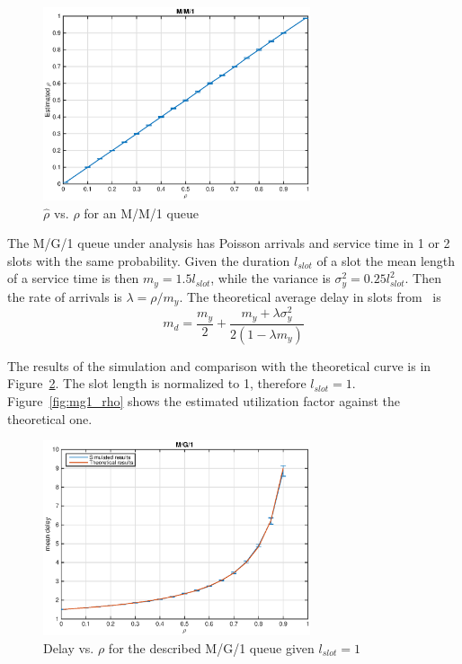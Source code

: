 \documentclass[10pt]{article}
\begin{document}
\begin{figure}[h!]
	\centering
	\includegraphics[width = 0.7\textwidth]{mm1_rho}
	\caption{$\hat{\rho}$ vs. $\rho$ for an M/M/1 queue}
	\label{fig:mm1_rho}
\end{figure}

The M/G/1 queue under analysis has Poisson arrivals and service time in 1 or 2 slots with the same probability. Given the duration $l_{slot}$ of a slot the mean length of a service time is then $m_y = 1.5 l_{slot}$, while the variance is $\sigma_y^2 = 0.25 l_{slot}^2$. Then the rate of arrivals is $\lambda = \rho/m_y$. The theoretical average delay in slots from~\cite{bz} is
\begin{equation}
	m_d = \frac{m_y}{2} + \frac{m_y + \lambda \sigma_y^2}{2(1- \lambda m_y)}
\end{equation}

The results of the simulation and comparison with the theoretical curve is in Figure~\ref{fig:mg1_dl}. The slot length is normalized to 1, therefore $l_{slot} = 1$. Figure~\ref{fig:mg1_rho} shows the estimated utilization factor against the theoretical one.

\begin{figure}[h!]
	\centering
	\includegraphics[width = 0.7\textwidth]{mg1_dl}
	\caption{Delay vs. $\rho$ for the described M/G/1 queue given $l_{slot} = 1$}
	\label{fig:mg1_dl}
\end{figure}
\end{document}
